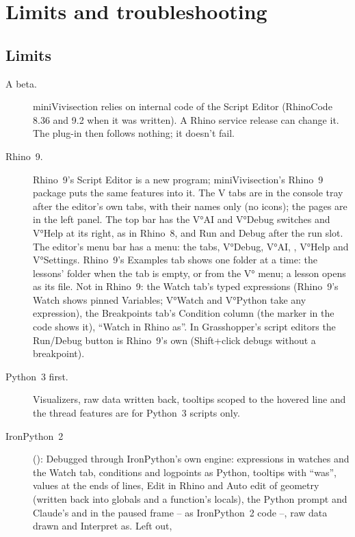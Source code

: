 \chapter{Limits and troubleshooting}\label{ch:limits}

\section{Limits}

\begin{description}
  \item[A beta.] miniVivisection relies on internal code of the Script Editor (RhinoCode 8.36 and 9.2 when it was
        written). A Rhino service release can change it. The plug-in then follows nothing; it doesn't fail.
  \item[Rhino~9.]\label{sec:rhino9} Rhino~9's Script Editor is a new program; miniVivisection's Rhino~9 package puts the same
        features into it. The V tabs are in the console tray after the editor's own tabs, with their names only (no
        icons); the pages are in the left panel. The top bar has the V°AI and V°Debug switches and V°Help at its right, as in
        Rhino~8, and Run and Debug after the run slot. The editor's menu bar has a  menu: the tabs, V°Debug, V°AI,
        , V°Help and V°Settings. Rhino~9's Examples tab shows one folder at a time: the
        lessons' folder when the tab is empty, or from the V° menu; a lesson opens as its file. Not in Rhino~9: the Watch
        tab's typed expressions (Rhino~9's Watch shows pinned Variables; V°Watch and V°Python take any expression), the
        Breakpoints tab's Condition column (the marker in the code shows it), “Watch in Rhino as”. In Grasshopper's script
        editors the Run/Debug button is Rhino~9's own (Shift+click debugs without a breakpoint).
  \item[Python~3 first.] Visualizers, raw data written back, tooltips scoped to the hovered line and the thread features
        are for Python~3 scripts only.
  \item[IronPython~2] (): Debugged through IronPython's own engine: expressions in watches and the Watch
        tab, conditions and logpoints as Python, tooltips with “was”, values at the ends of lines, Edit in Rhino and Auto
        edit of geometry (written back into globals and a function's locals), the Python prompt and Claude's 
        and  in the paused frame -- as IronPython~2 code --, raw data drawn and Interpret as. Left out,

\end{description}
